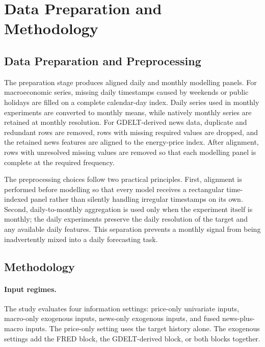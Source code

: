\documentclass[11pt,a4paper]{article}
\begin{document}
\section{Data Preparation and Methodology}\label{sec:methodology}

\subsection{Data Preparation and Preprocessing}\label{sec:data-prep}

The preparation stage produces aligned daily and monthly modelling panels. For macroeconomic series, missing daily timestamps caused by weekends or public holidays are filled on a complete calendar-day index. Daily series used in monthly experiments are converted to monthly means, while natively monthly series are retained at monthly resolution. For GDELT-derived news data, duplicate and redundant rows are removed, rows with missing required values are dropped, and the retained news features are aligned to the energy-price index. After alignment, rows with unresolved missing values are removed so that each modelling panel is complete at the required frequency.

The preprocessing choices follow two practical principles. First, alignment is performed before modelling so that every model receives a rectangular time-indexed panel rather than silently handling irregular timestamps on its own. Second, daily-to-monthly aggregation is used only when the experiment itself is monthly; the daily experiments preserve the daily resolution of the target and any available daily features. This separation prevents a monthly signal from being inadvertently mixed into a daily forecasting task.

\subsection{Methodology}\label{sec:methodology-details}

\paragraph{Input regimes.} The study evaluates four information settings: price-only univariate inputs, macro-only exogenous inputs, news-only exogenous inputs, and fused news-plus-macro inputs. The price-only setting uses the target history alone. The exogenous settings add the FRED block, the GDELT-derived block, or both blocks together.
\end{document}
